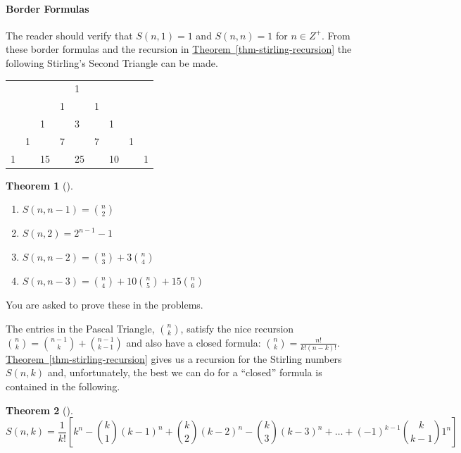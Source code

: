 \documentclass[10pt,]{book}
\theoremstyle{plain}
\newtheorem{theorem}{Theorem}[section]
\theoremstyle{definition}
\theoremstyle{definition}
\theoremstyle{definition}
\theoremstyle{definition}
\numberwithin{equation}{chapter}
\begin{document}
\paragraph[{Border Formulas}]{Border Formulas}\hypertarget{paragraphs-14}{}
\hypertarget{p-1073}{}%
The reader should verify that \(S(n,1) = 1\) and \(S(n,n) = 1\) for \(n \in Z^{+}\). From these border formulas and the recursion in \hyperref[thm-stirling-recursion]{Theorem~\ref{thm-stirling-recursion}} the following Stirling's Second Triangle can be made.%
\begin{sidebyside}{1}{0.25}{0.25}{0}
\begin{sbspanel}{0.5}
{\centering%
\begin{tabular}{lllllllll}
&&&&1&&&&\tabularnewline[0pt]
&&&1&&1&&&\tabularnewline[0pt]
&&1&&3&&1&&\tabularnewline[0pt]
&1&&7&&7&&1&\tabularnewline[0pt]
1&&15&&25&&10&&1
\end{tabular}
\par}
\end{sbspanel}
\end{sidebyside}
\begin{theorem}[{}]\label{thm-stirling-border}
\hypertarget{p-1074}{}%
\leavevmode%
\begin{enumerate}
\item\hypertarget{li-215}{}\hypertarget{p-1075}{}%
\(S\left( n,n - 1 \right) =\binom{n}{2}\)%
\item\hypertarget{li-216}{}\hypertarget{p-1076}{}%
\(S\left( n,2 \right) = 2^{n - 1} - 1\)%
\item\hypertarget{li-217}{}\hypertarget{p-1077}{}%
\(S\left( n,n - 2 \right) =\binom{n}{3}
+ 3\binom{n}{4}\)%
\item\hypertarget{li-218}{}\hypertarget{p-1078}{}%
\(S\left( n,n - 3 \right) =\binom{n}{4}
+ 10\binom{n}{5}
+ 15\binom{n}{6}\)%
\end{enumerate}
%
\end{theorem}
\hypertarget{p-1079}{}%
You are asked to prove these in the problems.%
\par
\hypertarget{p-1080}{}%
The entries in the Pascal Triangle, \(\binom{n}{k}\), satisfy the nice recursion \(\binom{n}{k} = \binom{n - 1}{k} + \binom{n - 1}{k - 1}\) and also have a closed formula: \(\binom{n}{k} = \frac{n!}{k!(n - k)!}\). \hyperref[thm-stirling-recursion]{Theorem~\ref{thm-stirling-recursion}} gives us a recursion for the Stirling numbers \(S(n,k)\) and, unfortunately, the best we can do for a ``closed'' formula is contained in the following.%
\begin{theorem}[{}]\label{thm-stirling-closed}
\hypertarget{p-1081}{}%
%
\begin{equation*}
S(n,k) = \frac{1}{k!}\left[k^{n} - \binom{k}{1} \left( k - 1 \right)^{n} + \binom{k}{2} \left( k - 2 \right)^{n} - \binom{k}{3} \left( k - 3 \right)^{n} + \ldots + \left( - 1 \right)^{k - 1}\binom{k}{k - 1} 1^{n} \right] 
\end{equation*}
%
\end{theorem}
\end{document}
